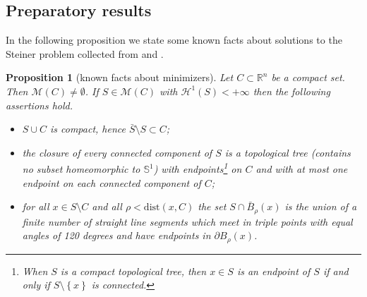 \documentclass{amsart}
\newcommand{\RR}{\mathbb R}
\renewcommand{\H}{\mathcal H}
\newcommand{\ENCLOSE}[1]{\left\{#1\right\}}
\newcommand{\M}{\mathcal{M}}
\renewcommand{\H}{\mathcal{H}}
\newcommand{\dist}{\mathrm{dist}}
\newtheorem{proposition}[theorem]{Proposition}
\newtheorem{conjecture}[theorem]{Conjecture}
\theoremstyle{definition}
\theoremstyle{remark}
\begin{document}
% 
% 

\subsection{Preparatory results}

In the following proposition we state some known facts about 
solutions to the Steiner problem collected from \cite{PaoSte12}
and \cite{IvaTuz94}.

\begin{proposition}[known facts about minimizers]\label{prop:PaoSte}
  Let $C\subset \RR^n$ be a compact set.
  Then $\M(C)\neq \emptyset$. If $S\in \M(C)$
  with $\H^1(S)<+\infty$
  then the following assertions hold.
  \begin{itemize}
    \item[(i)] $S\cup C$ is compact, 
    hence $\bar S \setminus S \subset C$;
    \item[(ii)] the closure of every connected component of $S$     
    is a topological tree 
    (contains no subset homeomorphic to $\mathbb S^1$)
    with endpoints\footnote{%
    When $S$ is a compact topological tree, then $x\in S$ is an endpoint 
    of $S$ if and only if $S\setminus \ENCLOSE{x}$ is connected.} 
    on $C$ and with at most one endpoint 
    on each connected component of $C$;
    \item[(iii)] for all $x\in S\setminus C$ and all 
    $\rho < \dist(x,C)$ the set $S\cap \bar B_\rho(x)$ 
    is the union of a finite number of straight line 
    segments which meet in triple points with equal 
    angles of 120 degrees and have endpoints in 
    $\partial B_\rho(x)$.
  \end{itemize}
\end{proposition}
\end{document}
